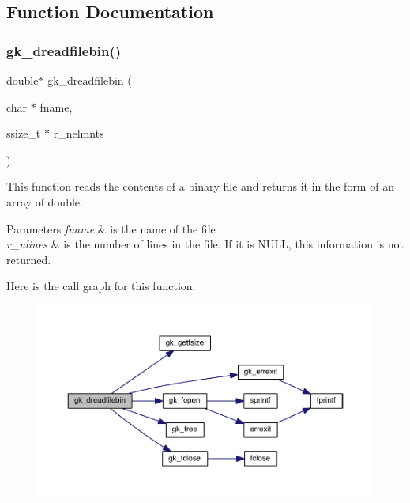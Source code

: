 \subsection{Function Documentation}
\mbox{\label{a00855_a2a9dbcb6a3f167b0fd20e431612e5aa9}} 
\subsubsection{\texorpdfstring{gk\+\_\+dreadfilebin()}{gk\_dreadfilebin()}}
{\footnotesize\ttfamily double$\ast$ gk\+\_\+dreadfilebin (\begin{DoxyParamCaption}\item[{char $\ast$}]{fname,  }\item[{ssize\+\_\+t $\ast$}]{r\+\_\+nelmnts }\end{DoxyParamCaption})}

This function reads the contents of a binary file and returns it in the form of an array of double. 
\begin{DoxyParams}{Parameters}
{\em fname} & is the name of the file \\
\hline
{\em r\+\_\+nlines} & is the number of lines in the file. If it is N\+U\+LL, this information is not returned. \\
\hline
\end{DoxyParams}
Here is the call graph for this function\+:\nopagebreak
\begin{figure}[H]
\begin{center}
\leavevmode
\includegraphics[width=350pt]{a00855_a2a9dbcb6a3f167b0fd20e431612e5aa9_cgraph}
\end{center}
\end{figure}
\mbox{\label{a00855_a70dec19fefaf0c84f3948b4679a73fec}} 
